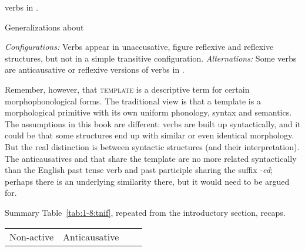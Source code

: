 \begin{exe}
\begin{xlist}
\begin{xlist}
\begin{exe}
\begin{xlist}
\begin{xlist}
\begin{exe}
\begin{xlist}
\begin{xlist}
\begin{exe}
\begin{exe}
\begin{xlist}
\begin{exe}
\begin{exe}
\begin{xlist}
\begin{exe}
\begin{exe}
\begin{exe}
\begin{exe}
\begin{exe}
\begin{xlist}
\begin{exe}
\begin{xlist}
\begin{exe}
\begin{exe}
\begin{xlist}
\begin{exe}
\begin{xlist}
\begin{exe}
\begin{xlist}
\begin{exe}
\begin{exe}
\begin{exe}
\begin{xlist}
\begin{exe}
\begin{exe}
\begin{exe}
\begin{xlist}
\begin{exe}
\begin{xlist}
\begin{exe}
\begin{xlist}
\begin{exe}
\begin{xlist}
\begin{exe}
\begin{exe}
\begin{exe}
\begin{exe}
\begin{xlist}
\begin{exe}
\begin{xlist}
\begin{exe}
\begin{xlist}
\begin{exe}
\begin{xlist}
\begin{exe}
\begin{xlist}
\begin{exe}
\begin{xlist}
\begin{exe}
\begin{exe}
\begin{exe}
\begin{exe}
\begin{xlist}
\begin{exe}
\begin{xlist}
\begin{exe}
\begin{xlist}
\begin{exe}
\begin{exe}
\begin{xlist}
\begin{exe}
\begin{xlist}
\begin{exe}
\begin{exe}
\begin{exe}
\begin{exe}
\begin{xlist}
\begin{xlist}
\begin{exe}
\begin{xlist}
\begin{exe}
\begin{exe}
\begin{exe}
\begin{xlist}
\begin{exe}
\begin{exe}
\begin{xlist}
\begin{exe}
\begin{exe}
\begin{exe}
\begin{xlist}
\begin{xlist}
\begin{exe}
\begin{xlist}
\begin{exe}
\begin{exe}
\begin{exe}
\begin{exe}
\begin{xlist}
\begin{exe}
\begin{xlist}
\begin{exe}
\begin{xlist}
\begin{exe}
\begin{xlist}
\begin{exe}
\begin{exe}
\begin{exe}
\begin{exe}
\begin{exe}
\begin{exe}
\begin{xlist}
\begin{exe}
\begin{xlist}
\begin{exe}
\begin{xlist}
\begin{exe}
\begin{xlist}
verbs in {\tkal}. 
 \z
\z 

 \begin{exe}
 \ex  \label{ex:gen-thit-sum}Generalizations about {\thit}
 \begin{xlist} 
 	\ex  \textit{Configurations:} Verbs appear in unaccusative, figure reflexive and reflexive structures, but not in a simple transitive configuration. 
 	\ex  \textit{Alternations:} Some verbs are anticausative or reflexive versions of verbs in {\tpie}. 
 \z
\z 

Remember, however, that \textsc{template} is a descriptive term for certain morphophonological forms. The traditional view is that a template is a morphological primitive with its own uniform phonology, syntax and semantics. The assumptions in this book are different: verbs are built up syntactically, and it could be that some structures end up with similar or even identical morphology. But the real distinction is between syntactic structures (and their interpretation). The anticausatives and  that share the template {\tnif} are no more related syntactically than the English past tense verb and past participle sharing the suffix -\emph{ed}; perhaps there is an underlying similarity there, but it would need to be argued for.

Summary Table~\ref{tab:1-8:tnif}, repeated from the introductory section, recaps.

\begin{table}
	\begin{tabular}{llcc} 
		\lsptoprule
		\multicolumn{2}{c}{Construction}	& {\tnif}	& {\thit} \\\midrule
		\multirow{3}{*}{Non-active} & Anticausative	& {\vz}	& 
\end{tabular}
\end{table}
\end{xlist}
\end{exe}
\end{xlist}
\end{exe}
\end{xlist}
\end{exe}
\end{xlist}
\end{exe}
\end{xlist}
\end{exe}
\end{exe}
\end{exe}
\end{exe}
\end{exe}
\end{exe}
\end{xlist}
\end{exe}
\end{xlist}
\end{exe}
\end{xlist}
\end{exe}
\end{xlist}
\end{exe}
\end{exe}
\end{exe}
\end{exe}
\end{xlist}
\end{exe}
\end{xlist}
\end{xlist}
\end{exe}
\end{exe}
\end{exe}
\end{xlist}
\end{exe}
\end{exe}
\end{xlist}
\end{exe}
\end{exe}
\end{exe}
\end{xlist}
\end{exe}
\end{xlist}
\end{xlist}
\end{exe}
\end{exe}
\end{exe}
\end{exe}
\end{xlist}
\end{exe}
\end{xlist}
\end{exe}
\end{exe}
\end{xlist}
\end{exe}
\end{xlist}
\end{exe}
\end{xlist}
\end{exe}
\end{exe}
\end{exe}
\end{exe}
\end{xlist}
\end{exe}
\end{xlist}
\end{exe}
\end{xlist}
\end{exe}
\end{xlist}
\end{exe}
\end{xlist}
\end{exe}
\end{xlist}
\end{exe}
\end{exe}
\end{exe}
\end{exe}
\end{xlist}
\end{exe}
\end{xlist}
\end{exe}
\end{xlist}
\end{exe}
\end{xlist}
\end{exe}
\end{exe}
\end{exe}
\end{xlist}
\end{exe}
\end{exe}
\end{exe}
\end{xlist}
\end{exe}
\end{xlist}
\end{exe}
\end{xlist}
\end{exe}
\end{exe}
\end{xlist}
\end{exe}
\end{xlist}
\end{exe}
\end{exe}
\end{exe}
\end{exe}
\end{exe}
\end{xlist}
\end{exe}
\end{exe}
\end{xlist}
\end{exe}
\end{exe}
\end{xlist}
\end{xlist}
\end{exe}
\end{xlist}
\end{xlist}
\end{exe}
\end{xlist}
\end{xlist}
\end{exe}
